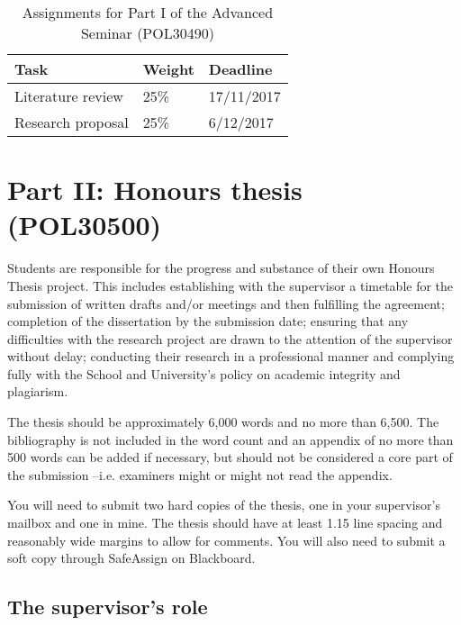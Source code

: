\documentclass[a4paper,12pt]{article}
\begin{document}
\bigskip

\begin{table}[ht]
	\centering
	\begin{tabular}{lll}
		\hline
		Task & Weight & Deadline \\
		\hline
		Literature review & 25\% & 17/11/2017\\
		Research proposal & 25\% & 6/12/2017 \\
		\hline
	\end{tabular}
	\caption{Assignments for Part I of the Advanced Seminar (POL30490)}
\end{table}


\section*{Part II: Honours thesis (POL30500)}

	Students are responsible for the progress and substance of their own Honours Thesis project. This includes establishing with the supervisor a timetable for the submission of written drafts and/or meetings and then fulfilling the agreement; completion of the dissertation by the submission date; ensuring that any difficulties with the research project are drawn to the attention of the supervisor without delay; conducting their research in a professional manner and complying fully with the School and University’s policy on academic integrity and plagiarism.
	
	The thesis should be approximately 6,000 words and no more than 6,500. The bibliography is not included in the word count and an appendix of no more than 500 words can be added if necessary, but should not be considered a core part of the submission --i.e. examiners might or might not read the appendix.

	You will need to submit two hard copies of the thesis, one in your supervisor's mailbox and one in mine. The thesis should have at least 1.15 line spacing and reasonably wide margins to allow for comments. You will also need to submit a soft copy through SafeAssign on Blackboard.
	
\subsection{The supervisor's role}
\end{document}
